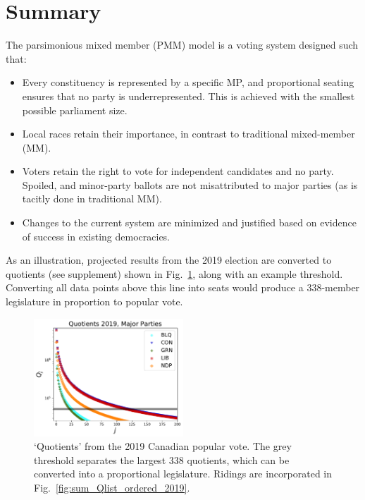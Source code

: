 \section*{Summary}
\renewcommand{\thefigure}{S-\arabic{figure}}

The parsimonious mixed member (PMM) model is a voting system designed such that:

\begin{itemize}
\item Every constituency is represented by a specific MP, and proportional seating ensures that no party is underrepresented. This is achieved with the smallest possible parliament size. 
\item Local races retain their importance, in contrast to traditional mixed-member (MM).
\item Voters retain the right to vote for independent candidates and no party. Spoiled, and minor-party ballots are not misattributed to major parties (as is tacitly done in traditional MM).
\item Changes to the current system are minimized and justified based on evidence of success in existing democracies.
\end{itemize}

As an illustration, projected results from the 2019 election are converted to quotients (see supplement) shown in Fig.~\ref{fig:sum_Qlist_byparty_2019}, along with an example threshold. Converting all data points above this line into seats would produce a 338-member legislature in proportion to popular vote. 
\begin{figure}[h!]
  \includegraphics[width=0.50\textwidth,clip]{PR_calcs/data/raw_2019/PMM_out/PMM_Qlist_byparty.pdf}
  \caption{`Quotients' from the 2019 Canadian popular vote. The grey threshold separates the largest 338 quotients, which can be converted into a proportional legislature. Ridings are incorporated in Fig.~\ref{fig:sum_Qlist_ordered_2019}. }
\label{fig:sum_Qlist_byparty_2019}
\end{figure}

